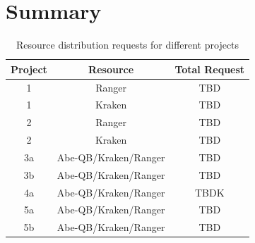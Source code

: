 \documentclass[a4paper,10pt]{article}
\begin{document}
\section*{Summary}

\begin{table}[!h]
\begin{center}
  \caption{Resource distribution requests for different projects  \newline}
\label{table:systems}
\begin{tabular}{|c| c | c | }
\hline 
Project & Resource & Total Request \\ 
\hline
1 & Ranger  & TBD \\
1 & Kraken &  TBD  \\
\hline
2 & Ranger & TBD \\
2 & Kraken & TBD \\
\hline
3a & Abe-QB/Kraken/Ranger & TBD \\
3b & Abe-QB/Kraken/Ranger & TBD \\
\hline
4a & Abe-QB/Kraken/Ranger & TBDK \\
\hline
5a & Abe-QB/Kraken/Ranger & TBD \\
5b & Abe-QB/Kraken/Ranger & TBD \\
\hline
\end{tabular}
\end{center}
\end{table}





%
%


\end{document}
